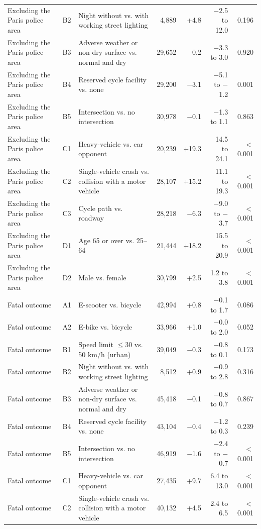 \begin{table}[tp]
\begin{threeparttable}
{\begin{tabular}{p{4.6cm}lp{4.4cm}rrrr}
Excluding the Paris police area & B2 & Night without vs. with working street lighting & 4,889 & +4.8 & $-$2.5 to 12.0 & 0.196 \\
Excluding the Paris police area & B3 & Adverse weather or non-dry surface vs. normal and dry & 29,652 & $-$0.2 & $-$3.3 to 3.0 & 0.920 \\
Excluding the Paris police area & B4 & Reserved cycle facility vs. none & 29,200 & $-$3.1 & $-$5.1 to $-$1.2 & 0.001 \\
Excluding the Paris police area & B5 & Intersection vs. no intersection & 30,978 & $-$0.1 & $-$1.3 to 1.1 & 0.863 \\
Excluding the Paris police area & C1 & Heavy-vehicle vs. car opponent & 20,239 & +19.3 & 14.5 to 24.1 & $<$0.001 \\
Excluding the Paris police area & C2 & Single-vehicle crash vs. collision with a motor vehicle & 28,107 & +15.2 & 11.1 to 19.3 & $<$0.001 \\
Excluding the Paris police area & C3 & Cycle path vs. roadway & 28,218 & $-$6.3 & $-$9.0 to $-$3.7 & $<$0.001 \\
Excluding the Paris police area & D1 & Age 65 or over vs. 25–64 & 21,444 & +18.2 & 15.5 to 20.9 & $<$0.001 \\
Excluding the Paris police area & D2 & Male vs. female & 30,799 & +2.5 & 1.2 to 3.8 & $<$0.001 \\
Fatal outcome & A1 & E-scooter vs. bicycle & 42,994 & +0.8 & $-$0.1 to 1.7 & 0.086 \\
Fatal outcome & A2 & E-bike vs. bicycle & 33,966 & +1.0 & $-$0.0 to 2.0 & 0.052 \\
Fatal outcome & B1 & Speed limit $\leq$30 vs. 50 km/h (urban) & 39,049 & $-$0.3 & $-$0.8 to 0.1 & 0.173 \\
Fatal outcome & B2 & Night without vs. with working street lighting & 8,512 & +0.9 & $-$0.9 to 2.8 & 0.316 \\
Fatal outcome & B3 & Adverse weather or non-dry surface vs. normal and dry & 45,418 & $-$0.1 & $-$0.8 to 0.7 & 0.867 \\
Fatal outcome & B4 & Reserved cycle facility vs. none & 43,104 & $-$0.4 & $-$1.2 to 0.3 & 0.239 \\
Fatal outcome & B5 & Intersection vs. no intersection & 46,919 & $-$1.6 & $-$2.4 to $-$0.7 & $<$0.001 \\
Fatal outcome & C1 & Heavy-vehicle vs. car opponent & 27,435 & +9.7 & 6.4 to 13.0 & $<$0.001 \\
Fatal outcome & C2 & Single-vehicle crash vs. collision with a motor vehicle & 40,132 & +4.5 & 2.4 to 6.5 & $<$0.001 \\

\end{tabular}}
\end{threeparttable}
\end{table}
